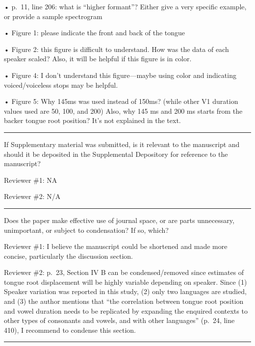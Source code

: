\documentclass[]{article}
\begin{document}
• p.~11, line 206: what is ``higher formant''? Either give a very
specific example, or provide a sample spectrogram

• Figure 1: please indicate the front and back of the tongue

• Figure 2: this figure is difficult to understand. How was the data of
each speaker scaled? Also, it will be helpful if this figure is in
color.

• Figure 4: I don't understand this figure---maybe using color and
indicating voiced/voiceless stops may be helpful.

• Figure 5: Why 145ms was used instead of 150ms? (while other V1
duration values used are 50, 100, and 200) Also, why 145 ms and 200 ms
starts from the backer tongue root position? It's not explained in the
text.

\begin{center}\rule{0.5\linewidth}{\linethickness}\end{center}

If Supplementary material was submitted, is it relevant to the
manuscript and should it be deposited in the Supplemental Depository for
reference to the manuscript?

Reviewer \#1: NA

Reviewer \#2: N/A

\begin{center}\rule{0.5\linewidth}{\linethickness}\end{center}

Does the paper make effective use of journal space, or are parts
unnecessary, unimportant, or subject to condensation? If so, which?

Reviewer \#1: I believe the manuscript could be shortened and made more
concise, particularly the discussion section.

Reviewer \#2: p.~23, Section IV B can be condensed/removed since
estimates of tongue root displacement will be highly variable depending
on speaker. Since (1) Speaker variation was reported in this study, (2)
only two languages are studied, and (3) the author mentions that ``the
correlation between tongue root position and vowel duration needs to be
replicated by expanding the enquired contexts to other types of
consonants and vowels, and with other languages'' (p.~24, line 410), I
recommend to condense this section.

\begin{center}\rule{0.5\linewidth}{\linethickness}\end{center}
\end{document}
